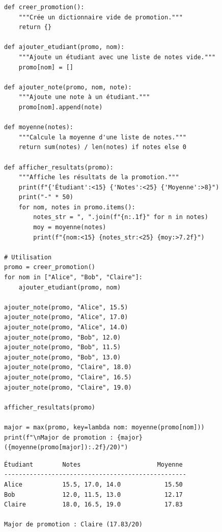 \begin{codeblock}[title=\textbf{Python}]
\begin{verbatim}
def creer_promotion():
    """Crée un dictionnaire vide de promotion."""
    return {}

def ajouter_etudiant(promo, nom):
    """Ajoute un étudiant avec une liste de notes vide."""
    promo[nom] = []

def ajouter_note(promo, nom, note):
    """Ajoute une note à un étudiant."""
    promo[nom].append(note)

def moyenne(notes):
    """Calcule la moyenne d'une liste de notes."""
    return sum(notes) / len(notes) if notes else 0

def afficher_resultats(promo):
    """Affiche les résultats de la promotion."""
    print(f"{'Étudiant':<15} {'Notes':<25} {'Moyenne':>8}")
    print("-" * 50)
    for nom, notes in promo.items():
        notes_str = ", ".join(f"{n:.1f}" for n in notes)
        moy = moyenne(notes)
        print(f"{nom:<15} {notes_str:<25} {moy:>7.2f}")

# Utilisation
promo = creer_promotion()
for nom in ["Alice", "Bob", "Claire"]:
    ajouter_etudiant(promo, nom)

ajouter_note(promo, "Alice", 15.5)
ajouter_note(promo, "Alice", 17.0)
ajouter_note(promo, "Alice", 14.0)
ajouter_note(promo, "Bob", 12.0)
ajouter_note(promo, "Bob", 11.5)
ajouter_note(promo, "Bob", 13.0)
ajouter_note(promo, "Claire", 18.0)
ajouter_note(promo, "Claire", 16.5)
ajouter_note(promo, "Claire", 19.0)

afficher_resultats(promo)

major = max(promo, key=lambda nom: moyenne(promo[nom]))
print(f"\nMajor de promotion : {major} ({moyenne(promo[major]):.2f}/20)")
\end{verbatim}
\end{codeblock}

\begin{codeoutput}
\begin{verbatim}
Étudiant        Notes                     Moyenne
--------------------------------------------------
Alice           15.5, 17.0, 14.0            15.50
Bob             12.0, 11.5, 13.0            12.17
Claire          18.0, 16.5, 19.0            17.83

Major de promotion : Claire (17.83/20)
\end{verbatim}
\end{codeoutput}

